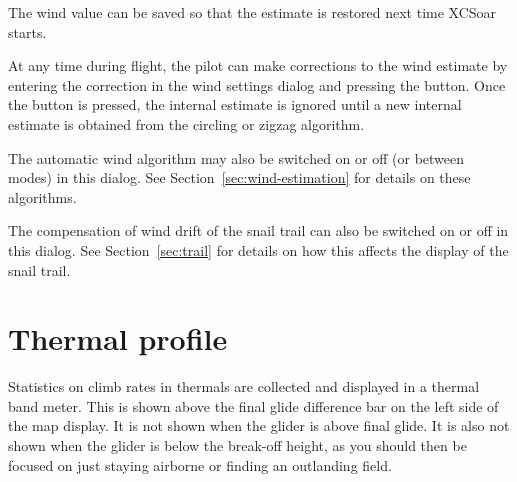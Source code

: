 \documentclass[a4paper,12pt]{refrep}
\begin{document}
The wind value can be saved so that the estimate is restored next time
XCSoar starts.

At any time during flight, the pilot can make corrections to the wind
estimate by entering the correction in the wind settings dialog and
pressing the  button.  Once the  button is
pressed, the internal estimate is ignored until a new internal
estimate is obtained from the circling or zigzag algorithm.

The automatic wind algorithm may also be switched on or off (or
between modes) in this dialog.  See Section~\ref{sec:wind-estimation}
for details on these algorithms.

The compensation of wind drift of the snail trail can also be switched
on or off in this dialog.  See Section~\ref{sec:trail} for details on
how this affects the display of the snail trail.

\section{Thermal profile}

Statistics on climb rates in thermals are collected and displayed in a
thermal band meter.  This is shown above the final glide difference
bar on the left side of the map display.  It is not shown when the
glider is above final glide.  It is also not shown when the glider is
below the break-off height, as you should then be focused on just
staying airborne or finding an outlanding field.

\vskip 1cm
\end{document}
